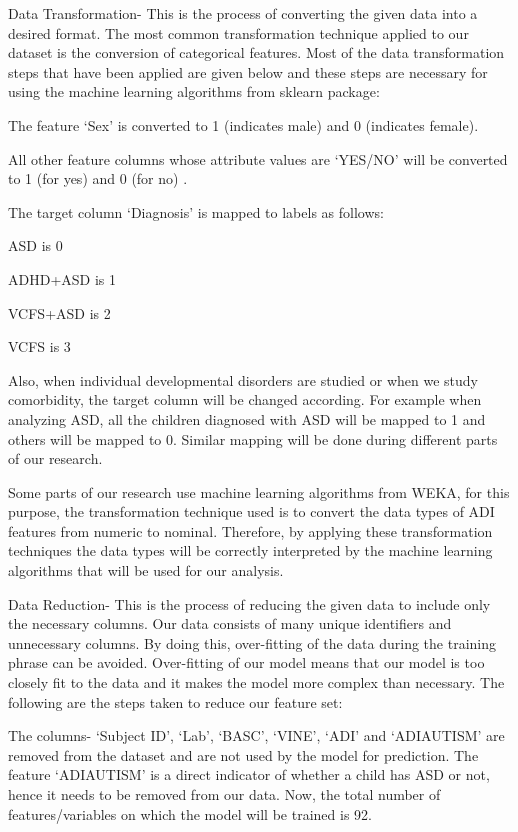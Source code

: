 \begin{itemize}
	\item Data Transformation- This is the process of converting the given data into a desired format. The most common transformation technique applied to our dataset is the conversion of  categorical features. Most of the data transformation steps that have been applied are given below and these steps are necessary for using the machine learning algorithms from sklearn package:
Also, when individual developmental disorders are studied or when we study comorbidity, the target column will be changed according. For example when analyzing ASD, all the children diagnosed with ASD will be mapped to 1 and others will be mapped to 0. Similar mapping will be done during different parts of our research.
	\end{compactenum}
Some parts of our research use machine learning algorithms from WEKA, for this purpose, the transformation technique used is to convert the data types of ADI features from numeric to nominal. Therefore, by applying these transformation techniques the data types will be correctly interpreted by the machine learning algorithms that will be used for our analysis.
\item Data Reduction- This is the process of reducing the given data to include only the necessary columns. Our data consists of many unique identifiers and unnecessary columns. By doing this, over-fitting of the data during the training phrase can be avoided. Over-fitting of our model means that our model is too closely fit to the data and it makes the model more complex than necessary.  The following are the steps taken to reduce our feature set:
	\begin{compactenum}
    \item The columns- `Subject ID', `Lab', `BASC', `VINE', `ADI' and `ADIAUTISM' are removed from the dataset and are not used by the model for prediction. The feature `ADIAUTISM' is a direct indicator of whether a child has ASD or not, hence it needs to be removed from our data. Now, the total number of features/variables on which the model will be trained is 92. 

\end{compactenum}
\end{itemize}

